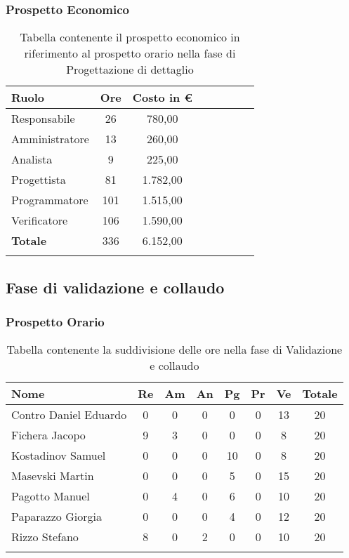 \documentclass[../piano_di_progetto.tex]{subfiles}
\begin{document}
\subsubsection{Prospetto Economico}

\begin{center}
	\begin{longtable}{|l|c|c|c|c|c|c|c|}
		\hline
		\rowcolor{lightgray}
		\textbf{Ruolo} & \textbf{Ore} & \textbf{Costo in €}\\

		\hline
		Responsabile & 26 & 780,00\\
		\hline
		Amministratore & 13 & 260,00\\
		\hline
		Analista & 9 & 225,00\\
		\hline
		Progettista & 81 & 1.782,00\\
		\hline
		Programmatore & 101 & 1.515,00\\
		\hline
		Verificatore & 106 & 1.590,00\\
		\hline
		\textbf{Totale} & 336 & 6.152,00\\
		\hline
		\caption{Tabella contenente il prospetto economico in riferimento al prospetto orario nella fase di Progettazione di dettaglio}
	\end{longtable}
\end{center}

\subsection{ Fase di validazione e collaudo}%
\label{sub:fase_valid_collaudo}
\subsubsection{Prospetto Orario}

\begin{center}
	\begin{longtable}{|l|c|c|c|c|c|c|c|}
		\hline
		\rowcolor{lightgray}
		\textbf{Nome} & \textbf{Re} & \textbf{Am} & \textbf{An} & \textbf{Pg}  & \textbf{Pr}   & \textbf{Ve} & \textbf{Totale} \\

		\hline
			Contro Daniel Eduardo & 0 & 0 & 0 & 0 & 0 & 13 & 20\\
		\hline
			Fichera Jacopo & 9 & 3 & 0 & 0 & 0 & 8 & 20 \\ 
		\hline
			Kostadinov Samuel & 0 & 0 & 0 & 10 & 0 & 8 & 20 \\ 		
		\hline
			Masevski Martin & 0 & 0 & 0 & 5 & 0 & 15 & 20 \\
		\hline
			Pagotto Manuel & 0 & 4 & 0 & 6 & 0 & 10 & 20 \\			
		\hline
			Paparazzo Giorgia & 0 & 0 & 0 & 4 & 0 & 12 & 20 \\
		\hline
			Rizzo Stefano & 8 & 0 & 2 & 0 & 0 & 10 & 20 \\
		\hline	

		\caption{Tabella contenente la suddivisione delle ore nella fase di Validazione e collaudo}
	\end{longtable}
\end{center}
\end{document}
